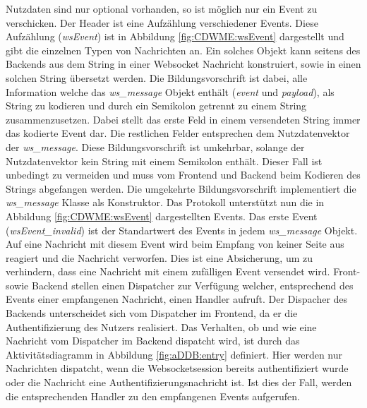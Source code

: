 Nutzdaten sind nur optional vorhanden, so ist möglich nur ein Event zu verschicken.
Der Header ist eine Aufzählung verschiedener Events. 
Diese Aufzählung (\emph{wsEvent}) ist in Abbildung \ref{fig:CDWME:wsEvent} dargestellt und gibt die einzelnen Typen von Nachrichten an. 
Ein solches Objekt kann seitens des Backends aus dem String in einer Websocket Nachricht konstruiert, 
sowie in einen solchen String übersetzt werden. 
Die Bildungsvorschrift ist dabei, alle Information welche das \emph{ws\_message} Objekt enthält (\emph{event} und \emph{payload}), als String zu kodieren 
und durch ein Semikolon getrennt zu einem String zusammenzusetzen.
Dabei stellt das erste Feld in einem versendeten String immer das kodierte Event dar. Die restlichen Felder entsprechen dem Nutzdatenvektor der \emph{ws\_message}.
Diese Bildungsvorschrift ist umkehrbar, solange der Nutzdatenvektor kein String mit einem Semikolon enthält.
Dieser Fall ist unbedingt zu vermeiden und muss vom Frontend und Backend beim Kodieren des Strings abgefangen werden.
Die umgekehrte Bildungsvorschrift implementiert die \emph{ws\_message} Klasse als Konstruktor. 
Das Protokoll unterstützt nun die in Abbildung \ref{fig:CDWME:wsEvent} dargestellten Events.
Das erste Event (\emph{wsEvent\_invalid}) ist der Standartwert des Events in jedem \emph{ws\_message} Objekt. 
Auf eine Nachricht mit diesem Event wird beim Empfang von keiner Seite aus reagiert und die Nachricht verworfen.
Dies ist eine Absicherung, um zu verhindern, dass eine Nachricht mit einem zufälligen Event versendet wird.
Front- sowie Backend stellen einen Dispatcher zur Verfügung welcher, entsprechend des Events einer empfangenen Nachricht, einen Handler aufruft.
Der Dispacher des Backends unterscheidet sich vom Dispatcher im Frontend, da er die Authentifizierung des Nutzers realisiert.
Das Verhalten, ob und wie eine Nachricht vom Dispatcher im Backend dispatcht wird, 
ist durch das Aktivitätsdiagramm in Abbildung \ref{fig:aDDB:entry} definiert.
Hier werden nur Nachrichten dispatcht, wenn die Websocketsession bereits authentifiziert wurde oder die Nachricht eine Authentifizierungsnachricht ist.
Ist dies der Fall, werden die entsprechenden Handler zu den empfangenen Events aufgerufen.

